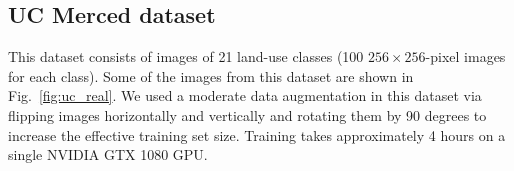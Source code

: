 \documentclass[journal]{IEEEtran}
\begin{document}
%		
%		
%		
%		
%		
%		
%		
%		
%		
%		

\subsection{UC Merced dataset}

This dataset consists of images of 21 land-use classes (100 $256\times256$-pixel images for each class).
Some of the images from this dataset are shown in Fig.~\ref{fig:uc_real}. We used a moderate data augmentation in this dataset via flipping images horizontally and vertically and rotating them by 90 degrees to increase the effective training set size. Training takes approximately 4 hours on a single NVIDIA GTX 1080 GPU.
\end{document}
